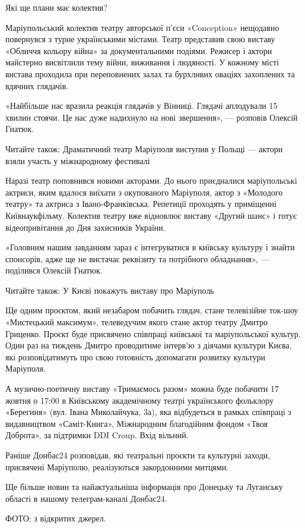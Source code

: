 Які ще плани має колектив?

Маріупольський колектив театру авторської п'єси «Conception» нещодавно
повернувся з турне українськими містами. Театр представив свою виставу «Обличчя
кольору війна» за документальними подіями. Режисер і актори майстерно
висвітлили тему війни, виживання і людяності. У кожному місті вистава проходила
при переповнених залах та бурхливих оваціях захоплених та вдячних глядачів.

«Найбільше нас вразила реакція глядачів у Вінниці. Глядачі аплодували 15 хвилин
стоячи. Це нас дуже надихнуло на нові звершення», — розповів Олексій Гнатюк.

Читайте також: Драматичний театр Маріуполя виступив у Польщі — актори взяли участь у міжнародному фестивалі

Наразі театр поповнився новими акторами. До нього приєдналися маріупольські
актриси, яким вдалося виїхати з окупованого Маріуполя, актор з «Молодого
театру» та актриса з Івано-Франківська. Репетиції проходять у приміщенні
Київнаукфільму. Колектив театру вже відновлює виставу «Другий шанс» і готує
відеопривітання до Дня захисників України.

«Головним нашим завданням зараз є інтегруватися в київську культуру і знайти
спонсорів, адже ще не вистачає реквізиту та потрібного обладнання», — поділився
Олексій Гнатюк.

Читайте також: У Києві покажуть виставу про Маріуполь

Ще одним проєктом, який незабаром побачить глядач, стане телевізійне ток-шоу
«Мистецький максимум», телеведучим якого стане актор театру Дмитро Гриценко.
Проєкт буде присвячено співпраці київської та маріупольської культур. Один раз
на тиждень Дмитро проводитиме інтерв'ю з діячами культури Києва, які
розповідатимуть про свою готовність допомагати розвитку культури Маріуполя.

А музично-поетичну виставу «Тримаємось разом» можна буде побачити 17 жовтня о
17:00 в Київському академічному театрі українського фольклору «Берегиня» (вул.
Івана Миколайчука, 3а), яка відбудеться в рамках співпраці з видавництвом
«Саміт-Книга», Міжнародним благодійним фондом «Твоя Доброта», за підтримки DDI
Croup. Вхід вільний. 

Раніше Донбас24 розповідав, які театральні проєкти та культурні заходи,
присвячені Маріуполю, реалізуються закордонними митцями.

Ще більше новин та найактуальніша інформація про Донецьку та Луганську області
в нашому телеграм-каналі Донбас24.

ФОТО: з відкритих джерел.
